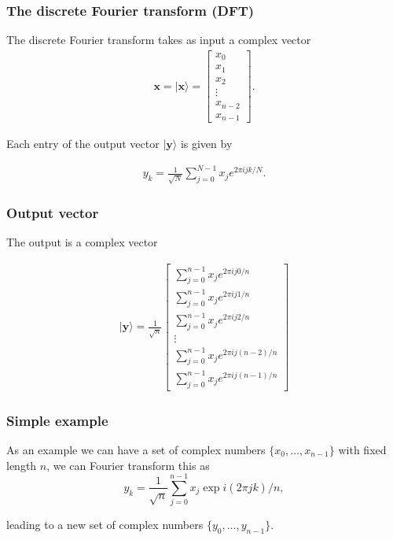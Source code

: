 \documentclass{beamer}
\begin{document}
\begin{frame}
\frametitle{The discrete Fourier transform (DFT)}

The discrete Fourier transform takes as input a complex vector
\begin{align*}
\bm{x} =\vert\bm{x}\rangle= 
\begin{bmatrix}
x_0 \\ 
x_1 \\ 
x_2 \\
\vdots \\ 
x_{n-2} \\
x_{n-1}
\end{bmatrix}.
\end{align*}

Each entry of the output vector $\vert \bm{y}\rangle$ is given by

\begin{align*}
y_k = \frac{1}{\sqrt{N}} \sum_{j=0}^{N-1} x_je^{2 \pi ijk/N}.
\end{align*}
\end{frame}

\begin{frame}
\frametitle{Output vector}

The output is a complex vector

\begin{align*}
\vert \bm{y}\rangle = 
\frac{1}{\sqrt{n}}
\begin{bmatrix}
\sum_{j=0}^{n-1} x_je^{2\pi ij0/n} \\
\sum_{j=0}^{n-1} x_je^{2\pi ij1/n} \\
\sum_{j=0}^{n-1} x_je^{2\pi ij2/n} \\
\vdots \\
\sum_{j=0}^{n-1} x_je^{2\pi ij(n-2)/n} \\
\sum_{j=0}^{n-1} x_je^{2\pi ij(n-1)/n}
\end{bmatrix}
\end{align*}
\end{frame}

\begin{frame}
\frametitle{Simple example}

As an example we can have a set of complex numbers
$\{x_0,\dots,x_{n-1}\}$ with fixed length $n$, we can Fourier
transform this as
\[
y_k = \frac{1}{\sqrt{n}} \sum_{j=0}^{n-1} x_j \exp{i(2\pi jk)/n},
\]

leading to a new set of complex numbers $\{ y_0,\dots,y_{n-1}\}$.
\end{frame}
\end{document}
